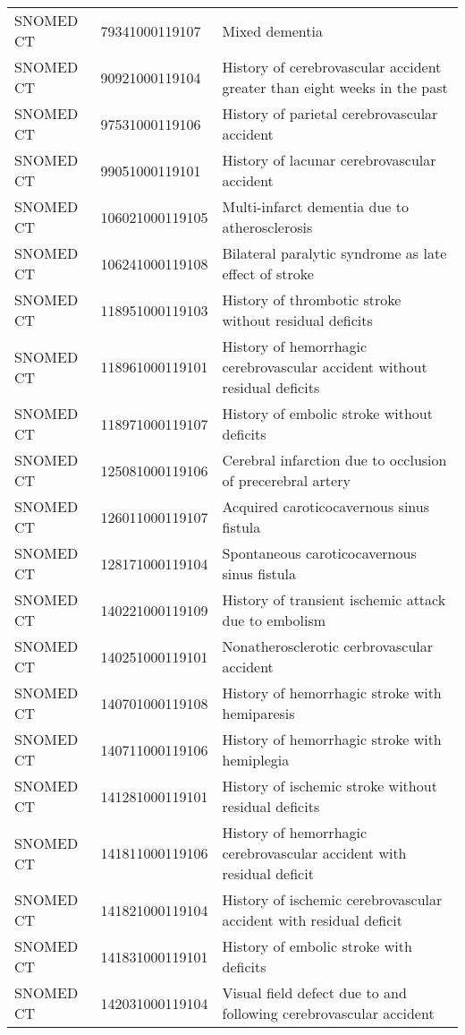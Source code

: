 \begin{longtable}{p{}p{}p{}}
  SNOMED CT & 79341000119107 & Mixed dementia \\ 
  SNOMED CT & 90921000119104 & History of cerebrovascular accident greater than eight weeks in the past \\ 
  SNOMED CT & 97531000119106 & History of parietal cerebrovascular accident \\ 
  SNOMED CT & 99051000119101 & History of lacunar cerebrovascular accident \\ 
  SNOMED CT & 106021000119105 & Multi-infarct dementia due to atherosclerosis \\ 
  SNOMED CT & 106241000119108 & Bilateral paralytic syndrome as late effect of stroke \\ 
  SNOMED CT & 118951000119103 & History of thrombotic stroke without residual deficits \\ 
  SNOMED CT & 118961000119101 & History of hemorrhagic cerebrovascular accident without residual deficits \\ 
  SNOMED CT & 118971000119107 & History of embolic stroke without deficits \\ 
  SNOMED CT & 125081000119106 & Cerebral infarction due to occlusion of precerebral artery \\ 
  SNOMED CT & 126011000119107 & Acquired caroticocavernous sinus fistula \\ 
  SNOMED CT & 128171000119104 & Spontaneous caroticocavernous sinus fistula \\ 
  SNOMED CT & 140221000119109 & History of transient ischemic attack due to embolism \\ 
  SNOMED CT & 140251000119101 & Nonatherosclerotic cerbrovascular accident \\ 
  SNOMED CT & 140701000119108 & History of hemorrhagic stroke with hemiparesis \\ 
  SNOMED CT & 140711000119106 & History of hemorrhagic stroke with hemiplegia \\ 
  SNOMED CT & 141281000119101 & History of ischemic stroke without residual deficits \\ 
  SNOMED CT & 141811000119106 & History of hemorrhagic cerebrovascular accident with residual deficit \\ 
  SNOMED CT & 141821000119104 & History of ischemic cerebrovascular accident with residual deficit \\ 
  SNOMED CT & 141831000119101 & History of embolic stroke with deficits \\ 
  SNOMED CT & 142031000119104 & Visual field defect due to and following cerebrovascular accident \\ 

\end{longtable}
